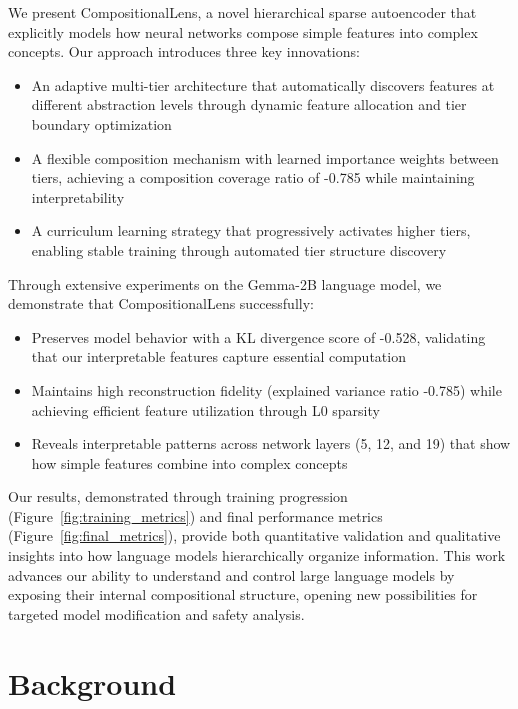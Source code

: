 \documentclass{article} %
\begin{document}
We present CompositionalLens, a novel hierarchical sparse autoencoder that explicitly models how neural networks compose simple features into complex concepts. Our approach introduces three key innovations:

\begin{itemize}
    \item An adaptive multi-tier architecture that automatically discovers features at different abstraction levels through dynamic feature allocation and tier boundary optimization
    \item A flexible composition mechanism with learned importance weights between tiers, achieving a composition coverage ratio of -0.785 while maintaining interpretability
    \item A curriculum learning strategy that progressively activates higher tiers, enabling stable training through automated tier structure discovery
\end{itemize}

Through extensive experiments on the Gemma-2B language model, we demonstrate that CompositionalLens successfully:
\begin{itemize}
    \item Preserves model behavior with a KL divergence score of -0.528, validating that our interpretable features capture essential computation
    \item Maintains high reconstruction fidelity (explained variance ratio -0.785) while achieving efficient feature utilization through L0 sparsity
    \item Reveals interpretable patterns across network layers (5, 12, and 19) that show how simple features combine into complex concepts
\end{itemize}

Our results, demonstrated through training progression (Figure~\ref{fig:training_metrics}) and final performance metrics (Figure~\ref{fig:final_metrics}), provide both quantitative validation and qualitative insights into how language models hierarchically organize information. This work advances our ability to understand and control large language models by exposing their internal compositional structure, opening new possibilities for targeted model modification and safety analysis.


\section{Background}
\label{sec:background}
\end{document}
